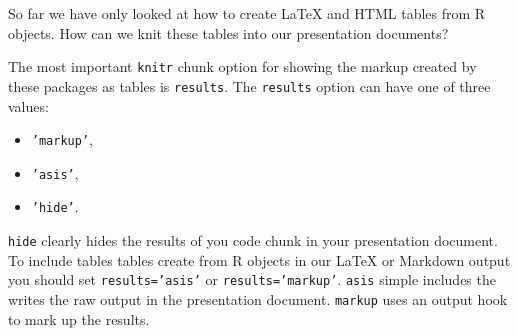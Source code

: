 So far we have only looked at how to create LaTeX and HTML tables from R objects. How can we knit these tables into our presentation documents?

The most important \texttt{knitr} chunk option for showing the markup created by these packages as tables is \texttt{results}. The \texttt{results} option can have one of three values:

\begin{itemize}
\item
  \texttt{'markup'},
\item
  \texttt{'asis'},
\item
  \texttt{'hide'}.
\end{itemize}

\texttt{hide} clearly hides the results of you code chunk in your presentation document. To include tables tables create from R objects in our LaTeX or Markdown output you should set \texttt{results='asis'} or \texttt{results='markup'}. \texttt{asis} simple includes the writes the raw output in the presentation document. \texttt{markup} uses an output hook to mark up the results.  



